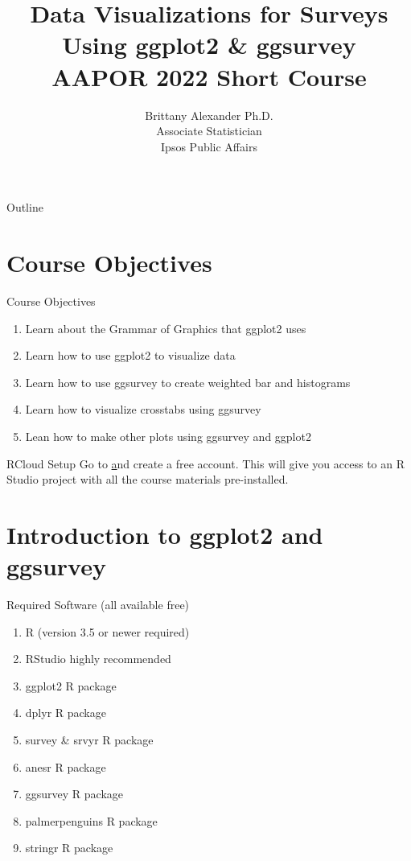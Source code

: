 \documentclass{beamer}\usepackage[]{graphicx}\usepackage[]{xcolor}
\title{Data Visualizations for Surveys Using ggplot2 \& ggsurvey \\
AAPOR 2022 Short Course}
\author{Brittany Alexander Ph.D. \\
Associate Statistician \\
Ipsos Public Affairs}
\begin{document}
\begin{frame}
\titlepage
\end{frame}
\begin{frame}{Outline}
\tableofcontents
\end{frame}
\section{Course Objectives}
\begin{frame}{Course Objectives}
\begin{enumerate}
\item Learn about the Grammar of Graphics that ggplot2 uses
\item Learn how to use ggplot2 to visualize data
\item Learn how to use ggsurvey to create weighted bar and histograms
\item Learn how to visualize crosstabs using ggsurvey
\item Lean how to make other plots using ggsurvey and ggplot2
\end{enumerate}
\end{frame}

\begin{frame}{RCloud Setup}
Go to \href{https://rstudio.cloud/project/3797940} and create a free account. This will give you access to an R Studio project with all the course materials pre-installed.
\end{frame}

\section{Introduction to ggplot2 and ggsurvey}
\begin{frame}{Required Software (all available free)}
\begin{enumerate}
\item R (version 3.5 or newer required)
\item RStudio highly recommended
\item ggplot2 R package
\item dplyr R package
\item survey \& srvyr R package
\item anesr R package
\item ggsurvey R package
\item palmerpenguins R package
\item stringr R package
\end{enumerate}
\end{frame}
\end{document}
